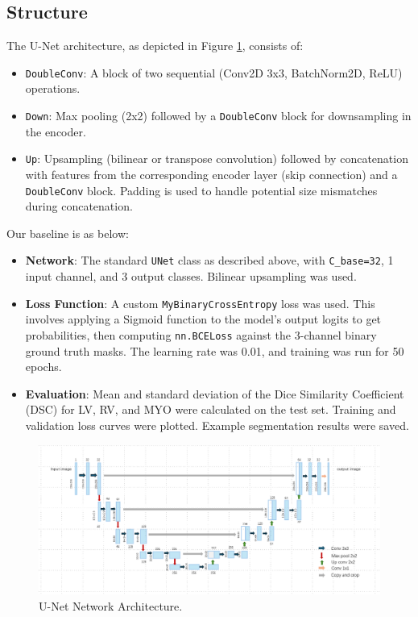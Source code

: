 \documentclass{article}
\begin{document}
\subsection{Structure}
The U-Net architecture, as depicted in Figure \ref{fig:network_architecture}, consists of:
\begin{itemize}
  \item \texttt{DoubleConv}: A block of two sequential (Conv2D 3x3, BatchNorm2D, ReLU) operations.
  \item \texttt{Down}: Max pooling (2x2) followed by a \texttt{DoubleConv} block for downsampling in the encoder.
  \item \texttt{Up}: Upsampling (bilinear or transpose convolution) followed by concatenation with features from the
        corresponding encoder layer (skip connection) and a \texttt{DoubleConv} block. Padding is used to handle potential
        size mismatches during concatenation.
\end{itemize}

Our baseline is as below:
\begin{itemize}
  \item \textbf{Network}: The standard \texttt{UNet} class as described above, with \texttt{C\_base=32}, 1 input channel,
        and 3 output classes. Bilinear upsampling was used.
  \item \textbf{Loss Function}: A custom \texttt{MyBinaryCrossEntropy} loss was used. This involves applying a Sigmoid
        function to the model's output logits to get probabilities, then computing \texttt{nn.BCELoss} against the 3-channel
        binary ground truth masks. The learning rate was 0.01, and training was run for 50 epochs.
  \item \textbf{Evaluation}: Mean and standard deviation of the Dice Similarity Coefficient (DSC) for LV, RV, and MYO
        were calculated on the test set. Training and validation loss curves were plotted.
        Example segmentation results were saved.
\end{itemize}

\begin{figure}[H]
  \centering
  \includegraphics[width=1\linewidth]{../result/network.png}
  \caption{U-Net Network Architecture.}
  \label{fig:network_architecture}
\end{figure}
\end{document}
